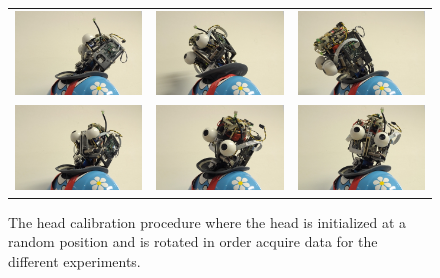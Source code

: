 \begin{figure}
    \centering
    \begin{tabular}{ccc}
        \includegraphics[width=0.275\columnwidth]{images/pos_1} &  
        \includegraphics[width=0.275\columnwidth]{images/pos_2} & 
        \includegraphics[width=0.275\columnwidth]{images/pos_3} \\
        \includegraphics[width=0.275\columnwidth]{images/pos_4} &  
        \includegraphics[width=0.275\columnwidth]{images/pos_5} & 
        \includegraphics[width=0.275\columnwidth]{images/pos_6} \\
    \end{tabular}
    \caption{The head calibration procedure where the head is initialized at a random position and is rotated in order acquire data for the different experiments.}
    \label{fig:head_calibration_procedure}
\end{figure}

